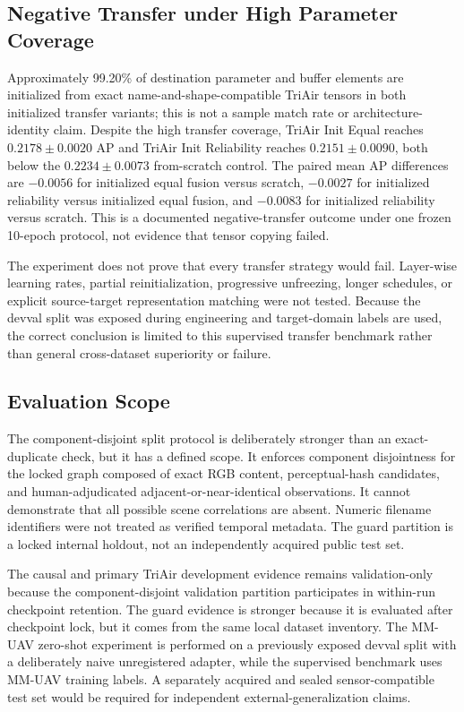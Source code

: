\subsection{Negative Transfer under High Parameter Coverage}
Approximately 99.20\% of destination parameter and buffer elements are initialized from exact name-and-shape-compatible TriAir tensors in both initialized transfer variants; this is not a sample match rate or architecture-identity claim. Despite the high transfer coverage, TriAir Init Equal reaches $0.2178\pm0.0020$ AP and TriAir Init Reliability reaches $0.2151\pm0.0090$, both below the $0.2234\pm0.0073$ from-scratch control. The paired mean AP differences are $-0.0056$ for initialized equal fusion versus scratch, $-0.0027$ for initialized reliability versus initialized equal fusion, and $-0.0083$ for initialized reliability versus scratch. This is a documented negative-transfer outcome under one frozen 10-epoch protocol, not evidence that tensor copying failed.

The experiment does not prove that every transfer strategy would fail. Layer-wise learning rates, partial reinitialization, progressive unfreezing, longer schedules, or explicit source-target representation matching were not tested. Because the devval split was exposed during engineering and target-domain labels are used, the correct conclusion is limited to this supervised transfer benchmark rather than general cross-dataset superiority or failure.

\subsection{Evaluation Scope}
The component-disjoint split protocol is deliberately stronger than an exact-duplicate check, but it has a defined scope. It enforces component disjointness for the locked graph composed of exact RGB content, perceptual-hash candidates, and human-adjudicated adjacent-or-near-identical observations. It cannot demonstrate that all possible scene correlations are absent. Numeric filename identifiers were not treated as verified temporal metadata. The guard partition is a locked internal holdout, not an independently acquired public test set.

The causal and primary TriAir development evidence remains validation-only because the component-disjoint validation partition participates in within-run checkpoint retention. The guard evidence is stronger because it is evaluated after checkpoint lock, but it comes from the same local dataset inventory. The MM-UAV zero-shot experiment is performed on a previously exposed devval split with a deliberately naive unregistered adapter, while the supervised benchmark uses MM-UAV training labels. A separately acquired and sealed sensor-compatible test set would be required for independent external-generalization claims.

